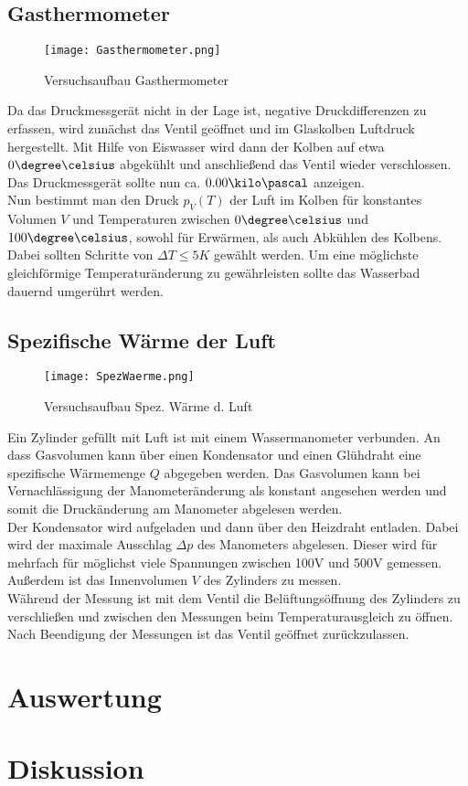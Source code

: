 \documentclass[12pt, a4paper, twoside]{scrartcl}
\begin{document}
\subsection{Gasthermometer}
\begin{figure}[h!]
	\centering
	\texttt{[image: Gasthermometer.png]}
	\caption{Versuchsaufbau Gasthermometer\protect\footnotemark} 
\end{figure}
Da das Druckmessgerät nicht in der Lage ist, negative  Druckdifferenzen zu erfassen, wird zunächst das Ventil geöffnet und im Glaskolben Luftdruck hergestellt. Mit Hilfe von Eiswasser wird dann der Kolben auf etwa $0\degree\celsius$ abgekühlt und anschließend das Ventil wieder verschlossen. Das Druckmessgerät sollte nun ca. $0.00\kilo\pascal$ anzeigen. \\
Nun bestimmt man den Druck $p_V \left( T \right)$ der Luft im Kolben für konstantes Volumen $V$ und Temperaturen zwischen $0\degree\celsius$ und $100\degree\celsius$, sowohl für Erwärmen, als auch Abkühlen des Kolbens. Dabei sollten Schritte von $\Delta T \le 5K $ gewählt werden. Um eine möglichste gleichförmige Temperaturänderung zu gewährleisten sollte das Wasserbad dauernd umgerührt werden.

\subsection{Spezifische Wärme der Luft}
\begin{figure}[h!]
	\centering
	\texttt{[image: SpezWaerme.png]}
	\caption{Versuchsaufbau Spez. Wärme d. Luft \protect\footnotemark}
\end{figure}
Ein Zylinder gefüllt mit Luft ist mit einem Wassermanometer verbunden. An dass Gasvolumen kann über einen Kondensator und einen Glühdraht eine spezifische Wärmemenge $Q$ abgegeben werden. Das Gasvolumen kann bei Vernachlässigung der Manometeränderung als konstant angesehen werden und somit die Druckänderung am Manometer abgelesen werden. \\
Der Kondensator wird aufgeladen und dann über den Heizdraht entladen. Dabei wird der maximale Ausschlag $\Delta p$ des Manometers abgelesen. Dieser wird für mehrfach für möglichst viele Spannungen zwischen 100V und 500V gemessen. Außerdem ist das Innenvolumen $V$ des Zylinders zu messen. \\
Während der Messung ist mit dem Ventil die Belüftungsöffnung des Zylinders zu verschließen und zwischen den Messungen beim Temperaturausgleich zu öffnen. Nach Beendigung der Messungen ist das Ventil geöffnet zurückzulassen.

\section{Auswertung}
\label{sec:auswertung}


\section{Diskussion}
\label{sec:diskussion}
\end{document}
